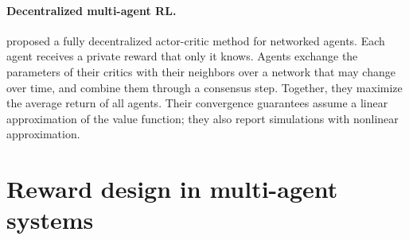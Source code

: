 \paragraph{Decentralized multi-agent \acs{RL}.} \citet{zhang+18networked} proposed a fully decentralized
actor-critic method for networked agents. Each agent receives a private reward that only it knows. Agents
exchange the parameters of their critics with their neighbors over a network that may change over time,
and combine them through a consensus step. Together, they maximize the average return of all agents.
Their convergence guarantees assume a linear approximation of the value function; they also report
simulations with nonlinear approximation.

\section{Reward design in multi-agent systems}
\label{sec:rw-reward}

